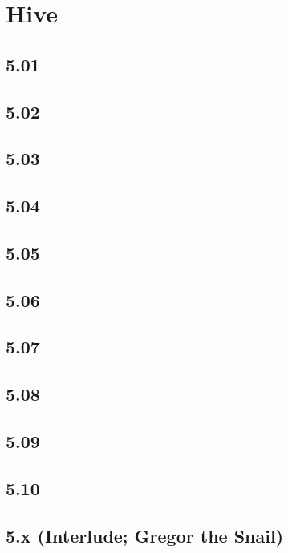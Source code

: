 \part{Hive}
 \chapter{5.01}
 \chapter{5.02}
 \chapter{5.03}
 \chapter{5.04}
 \chapter{5.05}
 \chapter{5.06}
 \chapter{5.07}
 \chapter{5.08}
 \chapter{5.09}
 \chapter{5.10}
 \chapter{5.x (Interlude; Gregor the Snail)}













